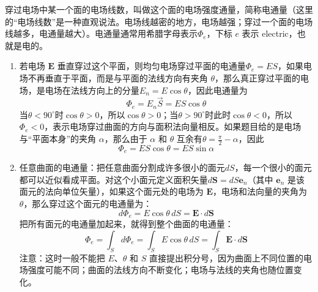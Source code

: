 \documentclass[lang=cn,11pt]{elegantbook}
\begin{document}
\begin{definition}[电场线与电通量]
  穿过电场中某一个面的电场线数，叫做这个面的电场强度通量，简称电通量（这里的“电场线数”是一种直观说法。电场线越密的地方，电场越强；穿过一个面的电场线越多，电通量越大）。电通量通常用希腊字母表示\(\Phi_e\)，下标 \(e\) 表示 electric，也就是电的。
  \begin{enumerate}
    \item 若电场 \(\mathbf E\) 垂直穿过这个平面，则均匀电场穿过平面的电通量\(\Phi_e=ES\)，如果电场不再垂直于平面，而是与平面的法线方向有夹角 \(\theta\)，那么真正穿过平面的电场，是电场在法线方向上的分量\(E_n=E\cos\theta\)，因此电通量为\[\Phi_e=E_n\vec{S}=ES\cos\theta\]当\(\theta<90^\circ\)时\(\cos\theta>0\)，所以\(\cos\theta>0\)；当\(\theta>90^\circ\)时此时\(\cos\theta<0\)，所以\(\Phi_e<0\)，表示电场穿过曲面的方向与面积法向量相反。如果题目给的是电场与“平面本身”的夹角 \(\alpha\)，那么由于 \(\alpha\) 和 \(\theta\) 互余有\(\theta=\frac{\pi}{2}-\alpha\)，因此\[\Phi_e=ES\cos\theta=ES\sin\alpha\]
    \item 任意曲面的电通量：把任意曲面分割成许多很小的面元\(dS\)，每一个很小的面元都可以近似看成平面。对这个小面元定义面积矢量\(d\mathbf S=dS\mathbf e_n\)（其中 \(\mathbf e_n\) 是该面元的法向单位矢量），如果这个面元处的电场为 \(\mathbf E\)，电场和法向量的夹角为 \(\theta\)，那么穿过这个面元的电通量为：\[d\Phi_e=E\cos\theta\,dS=\mathbf E\cdot d\mathbf S\]把所有面元的电通量加起来，就得到整个曲面的电通量：\[\Phi_e=\int_S d\Phi_e=\int_S E\cos\theta\,dS=\int_S\mathbf E\cdot d\mathbf S\]注意：这时一般不能把 \(E\)、\(\theta\) 和 \(S\) 直接提出积分号，因为曲面上不同位置的电场强度可能不同；曲面的法线方向不断变化；电场与法线的夹角也随位置变化。
  \end{enumerate}
\end{definition}
\end{document}
